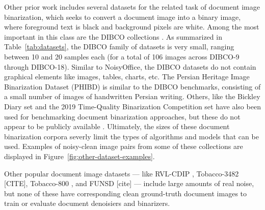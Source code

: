 \documentclass[runningheads]{llncs}
\begin{document}
Other prior work includes several datasets for the related task of document image binarization, which seeks to convert a document image into a binary image, where foreground text is black and background pixels are white.
Among the most important in this class are the DIBCO collections \cite{dibco-09,dibco-10,dibco-11,dibco-12,dibco-13,dibco-14,dibco-16,dibco-17,dibco-18}.
As summarized in Table~\ref{tab:datasets}, the DIBCO family of datasets is very small, ranging between 10 and 20 samples each (for a total of 106 images across DIBCO-9 through DIBCO-18).
Similar to NoisyOffice, the DIBCO datasets do not contain graphical elements like images, tables, charts, etc.
The Persian Heritage Image Binarization Dataset (PHIBD) \cite{phibc-2012-nafchi,nafchi-2013-icdar} is similar to the DIBCO benchmarks, consisting of a small number of images of handwritten Persian writing.
Others, like the Bickley Diary set \cite{bickley-diary} and the 2019 Time-Quality Binarization Competition set \cite{2019-time-quality-competition} have also been used for benchmarking document binarization approaches, but these do not appear to be publicly available \cite{tensmeyer-binarization-review-2020}.
Ultimately, the sizes of these document binarization corpora severly limit the types of algorithms and models that can be used.
Examples of noisy-clean image pairs from some of these collections are displayed in Figure~\ref{fig:other-dataset-examples}.

Other popular document image datasets --- like RVL-CDIP \cite{ref_RVL-CDIP}, Tobacco-3482 [CITE], Tobacco-800 \cite{ref_Tobacco800}, and FUNSD [cite] --- include large amounts of real noise, but none of these have corresponding clean ground-truth document images to train or evaluate document denoisiers and binarizers.
\end{document}
